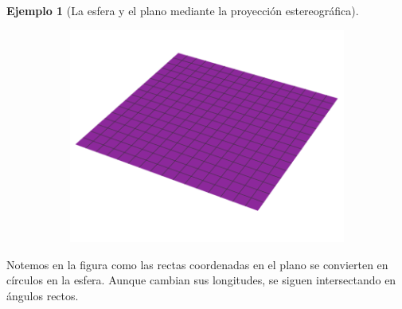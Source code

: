 \documentclass[spanish]{book}
\theoremstyle{definition}
\newtheorem*{ejem}{Ejemplo}
\begin{document}
\begin{ejem}[La esfera y el plano mediante la proyección estereográfica]
\begin{figure}[H]
\begin{subfigure}{0.25\textwidth}
			\includegraphics[width=\linewidth]{sup28}
		\end{subfigure}
	\end{figure}
	Notemos en la figura como las rectas coordenadas en el plano se convierten en círculos en la esfera. Aunque cambian sus longitudes, se siguen intersectando en ángulos rectos.
\end{ejem}
\end{document}
